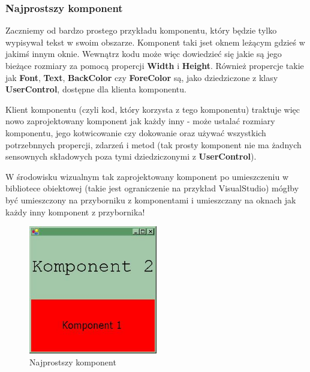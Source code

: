 \subsubsection{Najprostszy komponent}

Zaczniemy od bardzo prostego przykładu komponentu, który będzie tylko
wypisywał tekst w swoim obszarze. Komponent taki jset oknem leżącym gdzieś w jakimś innym oknie.
Wewnątrz kodu może więc dowiedzieć się jakie są jego bieżące rozmiary za pomocą propercji
{\bf Width} i {\bf Height}. Również propercje takie jak {\bf Font}, {\bf Text}, {\bf BackColor} czy
{\bf ForeColor} są, jako dziedziczone z klasy {\bf UserControl}, dostępne dla klienta komponentu.

Klient komponentu (czyli kod, który korzysta z tego komponentu) traktuje więc nowo zaprojektowany komponent
jak każdy inny - może ustalać rozmiary komponentu, jego kotwicowanie czy dokowanie oraz używać 
wszystkich potrzebnnych propercji, zdarzeń i metod (tak prosty komponent nie ma żadnych sensownych
składowych poza tymi dziedziczonymi z {\bf UserControl}).

W środowisku wizualnym tak zaprojektowany komponent po umieszczeniu w bibliotece obiektowej
(takie jest ograniczenie na przykład VisualStudio) mógłby być umieszczony na przyborniku z komponentami i
umieszczany na oknach jak każdy inny komponent z przybornika!

\begin{figure}
\begin{center}
\includegraphics[width=0.50\textwidth]{./pic/swf06}
\caption{Najprostszy komponent}
\end{center}
\end{figure}

